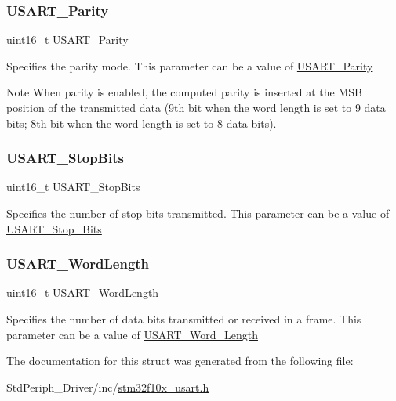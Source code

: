 \subsubsection{\texorpdfstring{USART\_Parity}{USART\_Parity}}
{\footnotesize\ttfamily uint16\+\_\+t U\+S\+A\+R\+T\+\_\+\+Parity}

Specifies the parity mode. This parameter can be a value of \mbox{\hyperlink{group___u_s_a_r_t___parity}{U\+S\+A\+R\+T\+\_\+\+Parity}} \begin{DoxyNote}{Note}
When parity is enabled, the computed parity is inserted at the M\+SB position of the transmitted data (9th bit when the word length is set to 9 data bits; 8th bit when the word length is set to 8 data bits). 
\end{DoxyNote}
\mbox{\label{struct_u_s_a_r_t___init_type_def_aa58409990a6a0bc99f432eb90e204c0f}} 
\subsubsection{\texorpdfstring{USART\_StopBits}{USART\_StopBits}}
{\footnotesize\ttfamily uint16\+\_\+t U\+S\+A\+R\+T\+\_\+\+Stop\+Bits}

Specifies the number of stop bits transmitted. This parameter can be a value of \mbox{\hyperlink{group___u_s_a_r_t___stop___bits}{U\+S\+A\+R\+T\+\_\+\+Stop\+\_\+\+Bits}} \mbox{\label{struct_u_s_a_r_t___init_type_def_aa1248b67914e095c0de768223eea9328}} 
\subsubsection{\texorpdfstring{USART\_WordLength}{USART\_WordLength}}
{\footnotesize\ttfamily uint16\+\_\+t U\+S\+A\+R\+T\+\_\+\+Word\+Length}

Specifies the number of data bits transmitted or received in a frame. This parameter can be a value of \mbox{\hyperlink{group___u_s_a_r_t___word___length}{U\+S\+A\+R\+T\+\_\+\+Word\+\_\+\+Length}} 

The documentation for this struct was generated from the following file\+:\begin{DoxyCompactItemize}
\item 
Std\+Periph\+\_\+\+Driver/inc/\mbox{\hyperlink{stm32f10x__usart_8h}{stm32f10x\+\_\+usart.\+h}}\end{DoxyCompactItemize}
